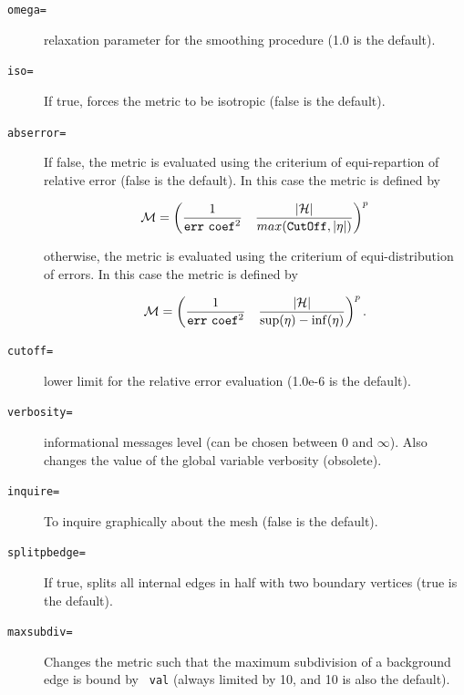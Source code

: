 \documentclass[a4paper,twoside,12pt]{book}
\begin{document}
\begin{description}
\item[\texttt{omega=}] relaxation parameter for the smoothing procedure (1.0 is the default).  

\item[\texttt{iso=}] If true, forces the metric to be isotropic (false is the default).  

\item[\texttt{abserror=}] If false, the metric is evaluated using the criterium of equi-repartion of relative error
(false is the default).  In this case the metric is defined by

\begin{equation}
  \mathcal{M} = \left({1\over\mathtt{err}\,\, \mathtt{coef}^2} \quad {
  |\mathcal{H}| \over max(\mathtt{CutOff},|\eta|)}\right)^p
  \label{eq err rel}
\end{equation}


otherwise, the metric is evaluated using the criterium of equi-distribution of errors.  In this case the metric is
defined by

\begin{equation}
  \mathcal{M} = \left({1\over \mathtt{err}\,\,\mathtt{coef}^2} \quad
  {|{\mathcal{H}|} \over
  {\sup(\eta)-\inf(\eta)}}\right)^p.\label{eq err abs}
\end{equation}

\item[\texttt{cutoff=}] lower limit for the relative error evaluation (1.0e-6 is the default).

\item[\texttt{verbosity=}] informational messages level (can be chosen between 0 and $\infty$). Also changes the value
of the global variable verbosity (obsolete).  

\item[\texttt{inquire=}] To inquire graphically about the mesh (false is the default).  

\item[\texttt{splitpbedge=}] If true, splits all internal edges in half with two boundary vertices (true is the
default).  

\item[\texttt{maxsubdiv=}] Changes the metric such that the maximum subdivision of a background edge is bound by {\tt
val} (always limited by 10, and 10 is also the default).  


\end{description}
\end{document}
